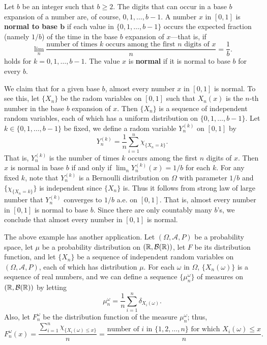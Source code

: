 \begin{example}
Let $b$ be an integer such that $b\geq 2$. The digits that can occur in a base $b$ expansion of a number are, of course, $0,1,\dots,b-1$. A number $x$ in $[0,1]$ is \textbf{normal to base $\bm{b}$} if each value in $\{0,1,\dots,b-1\}$ occurs the expected fraction (namely $1/b$) of the time in the base $b$ expansion of $x$---that is, if
\[\lim_n\frac{\text{number of times $k$ occurs among the first $n$ digits of $x$}}{n}=\frac{1}{b}.\]
holds for $k=0,1,\dots,b-1$. The value $x$ is \textbf{normal} if it is normal to base $b$ for every $b$.\par
We claim that for a given base $b$, almost every number $x$ in $[0,1]$ is normal. To see this, let $\{X_n\}$ be the radom variables on $[0,1]$ such that $X_n(x)$ is the $n$-th number in the base $b$ expansion of $x$. Then $\{X_n\}$ is a sequence of independent random variables, each of which has a uniform distribution on $\{0,1,\dots,b-1\}$. Let $k\in\{0,1,\dots,b-1\}$ be fixed, we define a radom variable $Y_n^{(k)}$ on $[0,1]$ by
\[Y_n^{(k)}=\frac{1}{n}\sum_{i=1}^{n}\chi_{\{X_n=k\}}.\]
That is, $Y_n^{(k)}$ is the number of times $k$ occurs among the first $n$ digits of $x$. Then $x$ is normal in base $b$ if and only if $\lim_nY_n^{(k)}(x)=1/b$ for each $k$. For any fixed $k$, note that $Y_n^{(k)}$ is a Bernoulli distribution on $\Omega$ with parameter $1/b$ and $\{\chi_{\{X_n=k\}}\}$ is independent since $\{X_n\}$ is. Thus it follows from strong law of large number that $Y_n^{(k)}$ converges to $1/b$ a.e. on $[0,1]$. That is, almost every number in $[0,1]$ is normal to base $b$. Since there are only countably many $b$'s, we conclude that almost every number in $[0,1]$ is normal.
\end{example}
The above example has another application. Let $(\Omega,\mathcal{A},P)$ be a probability space, let $\mu$ be a probability distribution on $(\mathbb{R},\mathcal{B}(\mathbb{R}))$, let $F$ be its distribution function, and let $\{X_n\}$ be a sequence of independent random variables on $(\Omega,\mathcal{A},P)$, each of which has distribution $\mu$. For each $\omega$ in $\Omega$, $\{X_n(\omega)\}$ is a sequence of real numbers, and we can define a sequence $\{\mu_n^{\omega}\}$ of measures on $(\mathbb{R},\mathcal{B}(\mathbb{R}))$ by letting
\[\mu_n^{\omega}=\frac{1}{n}\sum_{i=1}^{n}\delta_{X_i(\omega)}.\]
Also, let $F_n^{\omega}$ be the distribution function of the measure $\mu_n^{\omega}$; thus,
\[F_n^{\omega}(x)=\frac{\sum_{i=1}^{n}\chi_{\{X_i(\omega)\leq x\}}}{n}=\frac{\text{number of $i$ in $\{1,2,\dots,n\}$ for which $X_i(\omega)\leq x$}}{n}.\]
